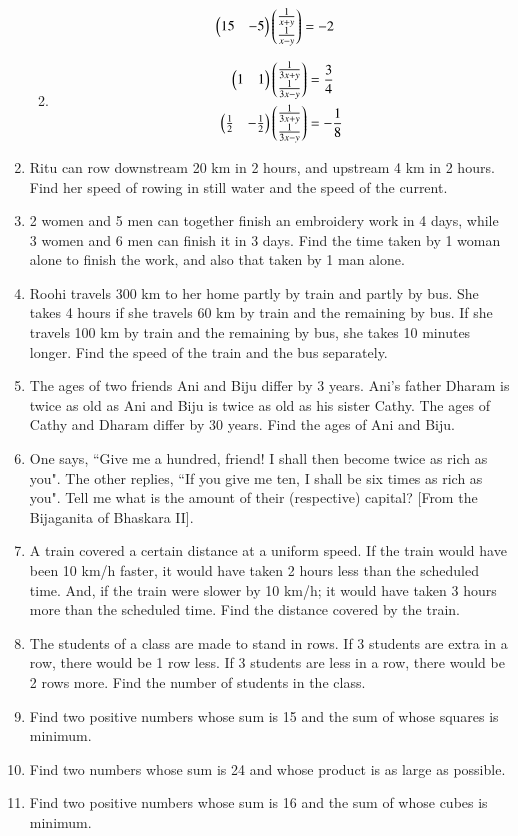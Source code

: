 \begin{enumerate}[label=\arabic*.,ref=\thesubsection.\theenumi]
\begin{enumerate}[itemsep=2pt]
\begin{align}
\begin{split}
\begin{pmatrix}15 & -5 \end{pmatrix}\begin{pmatrix}\frac{1}{x+y} \\ \frac{1}{x-y}\end{pmatrix}&=-2
\end{split}
\end{align}
\item 
\begin{align}
\begin{split}
\begin{pmatrix}1 & 1 \end{pmatrix}\begin{pmatrix}\frac{1}{3x+y} \\ \frac{1}{3x-y}\end{pmatrix}&=\frac{3}{4}\\
\begin{pmatrix}\frac{1}{2} & -\frac{1}{2} \end{pmatrix}\begin{pmatrix}\frac{1}{3x+y} \\ \frac{1}{3x-y}\end{pmatrix}&=-\frac{1}{8}
\end{split}
\end{align}
\end{enumerate}
%
\item Ritu can row downstream 20 km in 2 hours, and upstream 4 km in 2 hours. Find her speed of rowing in still water and the speed of the current.
\item  2 women and 5 men can together finish an embroidery work in 4 days, while 3 women and 6 men can finish it in 3 days. Find the time taken by 1 woman alone to finish the work, and also that taken by 1 man alone.
\item  Roohi travels 300 km to her home partly by train and partly by bus. She takes 4 hours if she travels 60 km by train and the remaining by bus. If she travels 100 km by train and the remaining by bus, she takes 10 minutes longer. Find the speed of the train and the bus separately.
\item The ages of two friends Ani and Biju differ by 3 years. Ani’s father Dharam is twice as old as Ani and Biju is twice as old as his sister Cathy. The ages of Cathy and Dharam differ by 30 years. Find the ages of Ani and Biju.
\item One says, ``Give me a hundred, friend! I shall then become twice as rich as you". The other replies, ``If you give me ten, I shall be six times as rich as you". Tell me what is the amount of their (respective) capital? [From the Bijaganita of Bhaskara II]. 
\item A train covered a certain distance at a uniform speed. If the train would have been 10 km/h faster, it would have taken 2 hours less than the scheduled time. And, if the train were slower by 10 km/h; it would have taken 3 hours more than the scheduled time. Find the distance covered by the train.
\item The students of a class are made to stand in rows. If 3 students are extra in a row, there would be 1 row less. If 3 students are less in a row, there would be 2 rows more. Find the number of students in the class.
\item Find two positive numbers whose sum is 15 and the sum of whose squares is minimum.
\item Find two numbers whose sum is 24 and whose product is as large as possible.
\item Find two positive numbers whose sum is 16 and the sum of whose cubes is minimum.


\end{enumerate}
